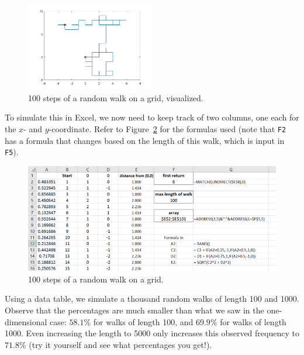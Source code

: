 \begin{figure}[h]
	\centering
	\includegraphics[width=0.5\textwidth]{fig/3_random2D_2.png}
	\caption{100 steps of a random walk on a grid, visualized. \label{fig:3_random2D_2}}
\end{figure}


To simulate this in Excel, we now need to keep track of two columns, one each for the $x$- and $y$-coordinate.
Refer to Figure~\ref{fig:3_random2D_1} for the formulas used (note that \texttt{F2} has a formula that changes based on the length of this walk, which is input in \texttt{F5}).

\vspace{0.5cm}

\begin{figure}[h]
	\centering
	\includegraphics[width=\textwidth]{fig/3_random2D_1.png}
	\caption{100 steps of a random walk on a grid. \label{fig:3_random2D_1}}
\end{figure}

\vspace{0.5cm}

Using a data table, we simulate a thousand random walks of length 100 and 1000.
Observe that the percentages are much smaller than what we saw in the one-dimensional case: $58.1\%$ for walks of length 100, and $69.9\%$ for walks of length 1000.
Even increasing the length to 5000 only increases this observed frequency to $71.8\%$ (try it yourself and see what percentages you get!).

\vspace{0.5cm}

